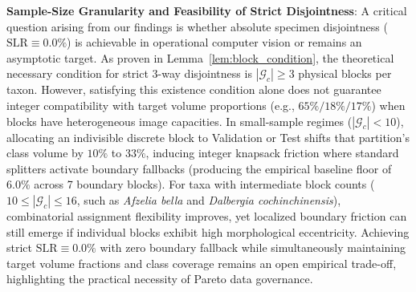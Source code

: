 \documentclass[a4paper,fleqn]{cas-sc}
\begin{document}
\textbf{Sample-Size Granularity and Feasibility of Strict Disjointness}: A critical question arising from our findings is whether absolute specimen disjointness ($\mathrm{SLR} \equiv 0.0\%$) is achievable in operational computer vision or remains an asymptotic target. As proven in Lemma~\ref{lem:block_condition}, the theoretical necessary condition for strict 3-way disjointness is $|\mathcal{G}_c| \ge 3$ physical blocks per taxon. However, satisfying this existence condition alone does not guarantee integer compatibility with target volume proportions (e.g., $65\%/18\%/17\%$) when blocks have heterogeneous image capacities. In small-sample regimes ($|\mathcal{G}_c| < 10$), allocating an indivisible discrete block to Validation or Test shifts that partition's class volume by $10\%$ to $33\%$, inducing integer knapsack friction where standard splitters activate boundary fallbacks (producing the empirical baseline floor of $6.0\%$ across 7 boundary blocks). For taxa with intermediate block counts ($10 \le |\mathcal{G}_c| \le 16$, such as \textit{Afzelia bella} and \textit{Dalbergia cochinchinensis}), combinatorial assignment flexibility improves, yet localized boundary friction can still emerge if individual blocks exhibit high morphological eccentricity. Achieving strict $\mathrm{SLR} \equiv 0.0\%$ with zero boundary fallback while simultaneously maintaining target volume fractions and class coverage remains an open empirical trade-off, highlighting the practical necessity of Pareto data governance.
\end{document}
